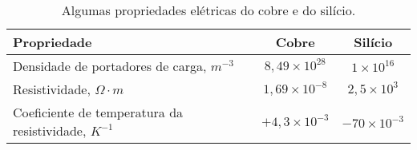 \begin{table}[!htb]
    \centering
    \caption{Algumas propriedades elétricas do cobre e do silício. \label{tab:tabela-exemplo1}}
    \begin{tabularx}{\textwidth}{lcc}
        \toprule
            Propriedade                                            & Cobre & Silício      \\ 
        \midrule
            Densidade de portadores de carga, $m^{-3}$             & $\mathrm{8,49} \times 10^{28}$ & $\mathrm{1} \times 10^{16}$     \\
            Resistividade, $\Omega \cdot m$                        & $\mathrm{1,69} \times 10^{-8}$  & $\mathrm{2,5} \times 10^{3}$   \\
            Coeficiente de temperatura da resistividade, $K^{-1}$  & $\mathrm{+4,3} \times 10^{-3}$  & $\mathrm{-70} \times 10^{-3}$  \\ 
        \bottomrule
    \end{tabularx}
\end{table}